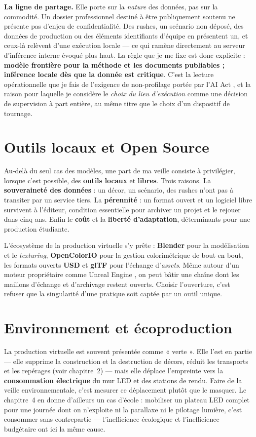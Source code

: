 \documentclass[11pt,a4paper]{report}
\begin{document}
\textbf{La ligne de partage.} Elle porte sur la \emph{nature} des données, pas sur la commodité.
Un dossier professionnel destiné à être publiquement soutenu ne présente pas d'enjeu de
confidentialité. Des rushes, un scénario non déposé, des données de production ou des éléments
identifiants d'équipe en présentent un, et ceux-là relèvent d'une exécution locale --- ce qui
ramène directement au serveur d'inférence interne évoqué plus haut. La règle que je me fixe est
donc explicite : \textbf{modèle frontière pour la méthode et les documents publiables ; inférence
locale dès que la donnée est critique}. C'est la lecture opérationnelle que je fais de l'exigence
de non-profilage portée par l'AI Act \autocite{aiact2024}, et la raison pour laquelle je considère
le \emph{choix du lieu d'exécution} comme une décision de supervision à part entière, au même
titre que le choix d'un dispositif de tournage.

\section{Outils locaux et Open Source}
Au-delà du seul cas des modèles, une part de ma veille consiste à privilégier, lorsque c'est
possible, des \textbf{outils locaux} et \textbf{libres}. Trois raisons. La \textbf{souveraineté des
données} : un décor, un scénario, des rushes n'ont pas à transiter par un service tiers. La
\textbf{pérennité} : un format ouvert et un logiciel libre survivent à l'éditeur, condition
essentielle pour archiver un projet et le rejouer dans cinq ans. Enfin le \textbf{coût} et la
\textbf{liberté d'adaptation}, déterminants pour une production étudiante.

L'écosystème de la production virtuelle s'y prête : \textbf{Blender} pour la modélisation et le
\emph{texturing}, \textbf{OpenColorIO} pour la gestion colorimétrique de bout en bout, les formats
ouverts \textbf{USD} et \textbf{glTF} pour l'échange d'\emph{assets}. Même autour d'un moteur
propriétaire comme Unreal Engine \autocite{epic_ue56}, on peut bâtir une chaîne dont les maillons
d'échange et d'archivage restent ouverts. Choisir l'ouverture, c'est refuser que la singularité
d'une pratique soit captée par un outil unique.

\section{Environnement et écoproduction}
La production virtuelle est souvent présentée comme « verte ». Elle l'est en partie --- elle
supprime la construction et la destruction de décors, réduit les transports et les repérages (voir
chapitre~2) --- mais elle déplace l'empreinte vers la \textbf{consommation électrique} du mur LED
et des stations de rendu. Faire de la veille environnementale, c'est mesurer ce déplacement
plutôt que le masquer. Le chapitre~4 en donne d'ailleurs un cas d'école : mobiliser un plateau
LED complet pour une journée dont on n'exploite ni la parallaxe ni le pilotage lumière, c'est
consommer sans contrepartie --- l'inefficience écologique et l'inefficience budgétaire ont ici la
même cause.
\end{document}
